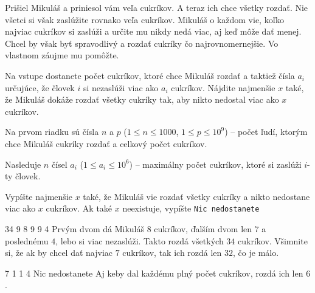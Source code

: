 





Prišiel Mikuláš a priniesol vám veľa cukríkov. A teraz ich chce všetky rozdať.
Nie všetci si však zaslúžite rovnako veľa cukríkov. Mikuláš o každom vie, koľko
najviac cukríkov si zaslúži a určite mu nikdy nedá viac, aj keď môže dať menej.
Chcel by však byť spravodlivý a rozdať cukríky čo najrovnomernejšie. Vo
vlastnom záujme mu pomôžte.


Na vstupe dostanete počet cukríkov, ktoré chce Mikuláš rozdať a taktiež čísla
$a_i$ určujúce, že človek $i$ si nezaslúži viac ako $a_i$ cukríkov. Nájdite
najmenšie $x$ také, že Mikuláš dokáže rozdať všetky cukríky tak, aby nikto
nedostal viac ako $x$ cukríkov.


Na prvom riadku sú čísla $n$ a $p$ ($1 \leq n \leq 1000$, $1 \leq p \leq 10^9$)
-- počet ľudí, ktorým chce Mikuláš cukríky rozdať a celkový počet cukríkov.

Nasleduje $n$ čísel $a_i$ ($1 \leq a_i \leq 10^6$) -- maximálny počet cukríkov,
ktoré si zaslúži $i$-ty človek.


Vypíšte najmenšie $x$ také, že Mikuláš vie rozdať všetky cukríky a nikto
nedostane viac ako $x$ cukríkov. Ak také $x$ neexistuje, vypíšte \texttt{Nic
nedostanete}


 34
9 8 9 9 4
\komentar
Prvým dvom dá Mikuláš $8$ cukríkov, ďalším dvom len $7$ a poslednému $4$, lebo
si viac nezaslúži.  Takto rozdá všetkých $34$ cukríkov. Všimnite si, že ak by
chcel dať najviac $7$ cukríkov, tak ich rozdá len $32$, čo je málo.
\koniec

 7
1 1 4
\vystup
Nic nedostanete
\komentar
Aj keby dal každému plný počet cukríkov, rozdá ich len $6$.
\koniec


